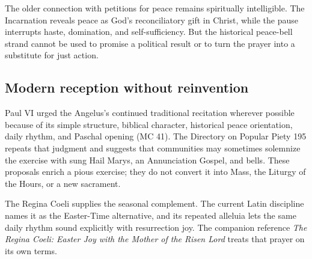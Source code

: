 The older connection with petitions for peace remains spiritually intelligible. The Incarnation reveals peace as God's reconciliatory gift in Christ, while the pause interrupts haste, domination, and self-sufficiency. But the historical peace-bell strand cannot be used to promise a political result or to turn the prayer into a substitute for just action.

\subsection{Modern reception without reinvention}

Paul VI urged the Angelus's continued traditional recitation wherever possible because of its simple structure, biblical character, historical peace orientation, daily rhythm, and Paschal opening (MC 41). The Directory on Popular Piety 195 repeats that judgment and suggests that communities may sometimes solemnize the exercise with sung Hail Marys, an Annunciation Gospel, and bells. These proposals enrich a pious exercise; they do not convert it into Mass, the Liturgy of the Hours, or a new sacrament.

The Regina Coeli supplies the seasonal complement. The current Latin discipline names it as the Easter-Time alternative, and its repeated alleluia lets the same daily rhythm sound explicitly with resurrection joy. The companion reference \textit{The Regina Coeli: Easter Joy with the Mother of the Risen Lord} treats that prayer on its own terms.
